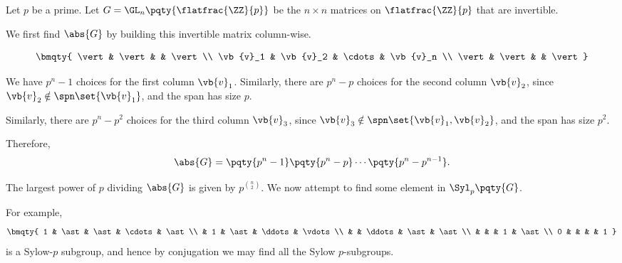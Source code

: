 \begin{example}
    \label{ex:gln-p}
    Let \(p\) be a prime. Let \(G = \GL_n \pqty{\flatfrac{\ZZ}{p}}\) be the \(n \times n\) matrices on \(\flatfrac{\ZZ}{p}\) that are invertible.

    We first find \(\abs{G}\) by building this invertible matrix column-wise.

    \[
        \bmqty{
            \vert & \vert & & \vert \\
            \vb{v}_1 & \vb{v}_2 & \cdots & \vb{v}_n \\
            \vert & \vert & & \vert
        }
    \]

    We have \(p^n - 1\) choices for the first column \(\vb{v}_1\). Similarly, there are \(p^n - p\) choices for the second column \(\vb{v}_2\), since \(\vb{v}_2 \notin \spn \set{\vb{v}_1}\), and the span has size \(p\).

    Similarly, there are \(p^n - p^2\) choices for the third column \(\vb{v}_3\), since \(\vb{v}_3 \notin \spn \set{\vb{v}_1, \vb{v}_2}\), and the span has size \(p^2\).

    Therefore,
    \[
        \abs{G} = \pqty{p^n - 1} \pqty{p^n - p} \cdots \pqty{p^n - p^{n - 1}}.
    \]  

    The largest power of \(p\) dividing \(\abs{G}\) is given by \(p^{\binom{n}{2}}\). We now attempt to find some element in \(\Syl_{p} \pqty{G}\).

    For example,
    \[
        \bmqty{
            1 & \ast & \ast   & \cdots & \ast \\
              & 1    & \ast   & \ddots & \vdots \\
              &      & \ddots & \ast   & \ast \\
              &      &        & 1      & \ast \\
            0 &      &        &        & 1 
        }
    \]
    is a Sylow-\(p\) subgroup, and hence by conjugation we may find all the Sylow \(p\)-subgroups.
\end{example}